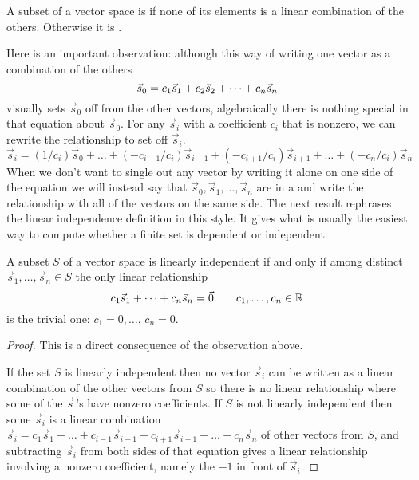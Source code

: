 \begin{definition}
\label{def:LinInd}
A subset of a vector space is
%
if none of its elements is a linear combination of the others.
Otherwise it is .
\end{definition}

Here is an important observation:
although this way of writing one vector as a combination of the others
\begin{equation*}
   \vec{s}_0=c_1\vec{s}_1+c_2\vec{s}_2+\cdots +c_n\vec{s}_n
\end{equation*}
visually sets \( \vec{s}_0 \) off from the other vectors, algebraically
there is nothing special in that equation about \( \vec{s}_0 \).
For any \( \vec{s}_i \) with a coefficient $c_i$ that is nonzero,
we can rewrite the relationship to set off \( \vec{s}_i \).
\begin{equation*}
   \vec{s}_i=(1/c_i)\vec{s}_0+\dots
              +(-c_{i-1}/c_i)\vec{s}_{i-1}+(-c_{i+1}/c_i)\vec{s}_{i+1}
              +\dots+(-c_n/c_i)\vec{s}_n
\end{equation*}
When we don't want to single out any vector by writing it alone on
one side of the equation we will instead say that
\( \vec{s}_0,\vec{s}_1,\dots,\vec{s}_n \) are in a
%
and write the relationship
with all of the vectors on the same side.
The next result rephrases the linear independence definition in this style.
It gives what is usually the easiest way to compute whether
a finite set is dependent or independent.

\begin{lemma}   \label{le:LDIffANonTrivLinRel}
A subset \( S \) of a vector space is linearly independent if and only if 
among distinct \( \vec{s}_1,\dots,\vec{s}_n\in S \) 
the only linear relationship 
\begin{equation*}
   c_1\vec{s}_1+\dots+c_n\vec{s}_n=\vec{0}
   \qquad c_1,\dots,c_n\in\mathbb{R}
\end{equation*}
is the trivial one: \( c_1=0,\dots,\,c_n=0 \).
\end{lemma}

\begin{proof}
This is a direct consequence of the observation above.

If the set \( S \) is linearly independent then no vector
$\vec{s}_i$ can be written 
as a linear combination of the other vectors from $S$
so there is no linear relationship where some of the $\vec{s}\,$'s have 
nonzero coefficients.
If \( S \) is not linearly independent then some \( \vec{s}_i \) is a linear
combination 
$\vec{s}_i=c_1\vec{s}_1+\dots+c_{i-1}\vec{s}_{i-1}
    +c_{i+1}\vec{s}_{i+1}+\dots+c_n\vec{s}_n$
of other vectors from \( S \), and subtracting $\vec{s}_i$ from both sides
of that equation gives a linear relationship
involving a nonzero coefficient, 
namely the \( -1 \) in front of \( \vec{s}_i \).
\end{proof}

